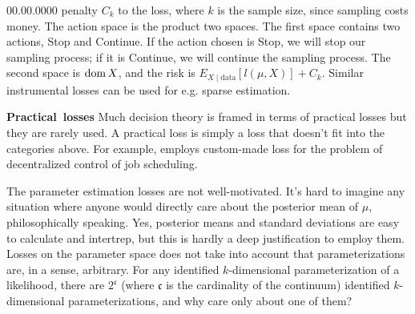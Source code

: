 \begin{lyxlist}{00.00.0000}
penalty $C_{k}$ to the loss, where $k$ is the sample size, since
sampling costs money. The action space is the product two spaces.
The first space contains two actions, Stop and Continue. If the action
chosen is Stop, we will stop our sampling process; if it is Continue,
we will continue the sampling process. The second space is $\operatorname{dom} X$,
and the risk is $E_{X\mid\textrm{data}}[l(\mu,X)]+C_{k}$. Similar
instrumental losses can be used for e.g. sparse estimation.
\item [{\textbf{Practical~losses}}] Much decision theory is framed in
terms of practical losses but they are rarely used. A practical loss
is simply a loss that doesn't fit into the categories above. For example,
\textcite{Stankovic1985-th} employs custom-made loss for the problem
of decentralized control of job scheduling. 
\end{lyxlist}
The parameter estimation losses are not well-motivated. It's hard
to imagine any situation where anyone would directly care about the
posterior mean of $\mu$, philosophically speaking. Yes, posterior
means and standard deviations are easy to calculate and intertrep,
but this is hardly a deep justification to employ them. Losses on the parameter space does not take into account that parameterizations are, in a sense, arbitrary. For any identified $k$-dimensional parameterization of a likelihood, there are $2^{\mathfrak{c}}$ (where $\mathfrak{c}$ is the cardinality of the continuum) identified $k$-dimensional parameterizations, and why care only about one of them? 

